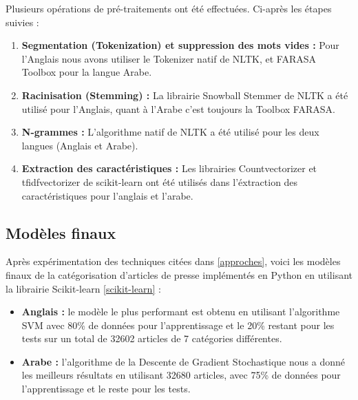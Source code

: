             Plusieurs opérations de pré-traitements ont été effectuées. Ci-après les étapes suivies :
            \begin{enumerate}
                \item{\textbf{Segmentation (Tokenization) et suppression des mots vides :} } Pour l'Anglais nous avons utiliser le Tokenizer natif de NLTK, et FARASA Toolbox pour la langue Arabe.\\  
                
                \item{\textbf{Racinisation (Stemming) :} } 
                La librairie Snowball Stemmer de NLTK a été utilisé pour l'Anglais, quant à l'Arabe c'est toujours la Toolbox FARASA.\\

                \item{\textbf{N-grammes :} }
                 L'algorithme natif de NLTK a été utilisé pour les deux langues (Anglais et Arabe).\\ 
                
                \item{\textbf{Extraction des caractéristiques :} }
                Les librairies Countvectorizer et tfidfvectorizer de scikit-learn ont été utilisés dans l'éxtraction des caractéristiques pour l'anglais et l'arabe.\\
            \end{enumerate}

            
    \subsection{Modèles finaux}
        Après expérimentation des techniques citées dans \ref{approches}, voici les modèles finaux de la catégorisation d'articles de presse implémentés en Python en utilisant la librairie Scikit-learn \ref{scikit-learn} :
        \begin{itemize}
            \item{\textbf{Anglais :} }le modèle le plus performant est obtenu en utilisant l'algorithme SVM avec 80\% de données pour l'apprentissage et le 20\% restant pour les tests sur un total de 32602 articles de 7 catégories différentes.\\

            \item{\textbf{Arabe :} }l'algorithme de la Descente de Gradient Stochastique nous a donné les meilleurs résultats en utilisant 32680 articles, avec 75\% de données pour l'apprentissage et le reste pour les tests. 
        \end{itemize}
